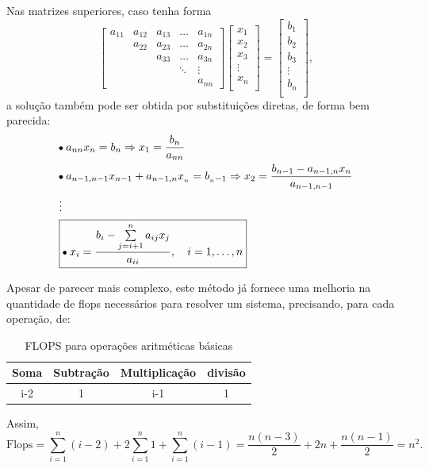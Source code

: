 \documentclass[../numerical_methods.tex]{subfiles}
\begin{document}
Nas matrizes superiores, caso tenha forma
\[
	\begin{bmatrix}
		a_{11} & a_{12} & a_{13} & \dotsc & a_{1n} \\
		       & a_{22} & a_{23} & \dotsc & a_{2n} \\
		       &        & a_{33} & \dotsc & a_{3n} \\
		       &        &        & \ddots & \vdots \\
		       &        &        &        & a_{nn}
	\end{bmatrix} \begin{bmatrix}
		x_{1}  \\
		x_{2}  \\
		x_{3}  \\
		\vdots \\
		x_{n}  \\
	\end{bmatrix} = \begin{bmatrix}
		b_{1}  \\
		b_{2}  \\
		b_{3}  \\
		\vdots \\
		b_{n}  \\
	\end{bmatrix},
\]
a solução também pode ser obtida por substituições diretas, de forma bem parecida:
\begin{align*}
	 & \tikz[baseline=-0.5ex]\draw[black, fill=black, radius=1.5pt](0, 0)circle;\; a_{nn}x_n= b_n \Rightarrow x_1 = \frac{b_n}{a_{nn}}                                                          \\
	 & \tikz[baseline=-0.5ex]\draw[black, fill=black, radius=1.5pt](0, 0)circle;\; a_{n-1, n-1}x_{n-1} + a_{n-1, n}x_{_n}=b_{_n-1} \Rightarrow x_{2}=\frac{b_{n-1}-a_{n-1, n}x_n}{a_{n-1, n-1}} \\
	 & \vdots                                                                                                                                                                                   \\
	 & \boxed{\tikz[baseline=-0.5ex]\draw[black, fill=black, radius=1.5pt](0, 0)circle;\; x_{i}=\frac{b_{i}-\sum\limits_{j=i+1}^{n}a_{ij}x_{j}}{a_{ii}},\quad i=1, \dotsc , n}
\end{align*}

Apesar de parecer mais complexo, este método já fornece uma melhoria na quantidade de flops necessários para resolver um sistema, precisando, para cada operação, de:
\begin{table}[H]
	\centering
	\caption{FLOPS para operações aritméticas básicas}
	\begin{tabular}{c | c | c | c}
		Soma & Subtração & Multiplicação & divisão \\
		\hline
		\hline
		i-2  & 1         & i-1           & 1       \\
	\end{tabular}
\end{table}
Assim,
\[
	\mathrm{Flops}=\sum\limits_{i=1}^{n}(i-2)+2\sum\limits_{i=1}^{n}1 + \sum\limits_{i=1}^{n}(i-1) = \frac{n(n-3)}{2} + 2n + \frac{n(n-1)}{2} = n^{2}.
\]
\end{document}
